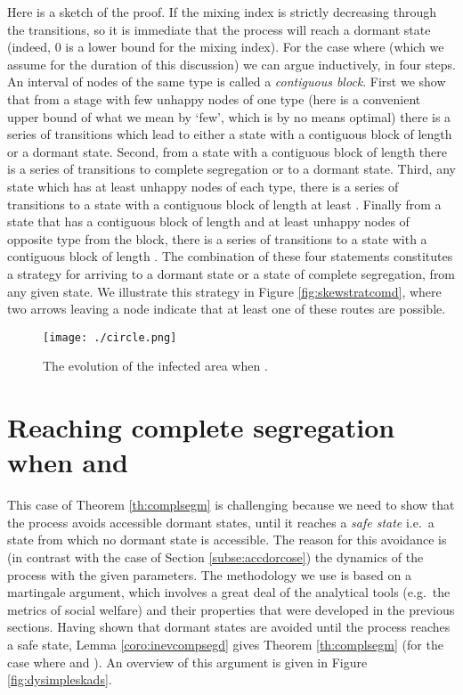 \documentclass[11pt]{article}
\theoremstyle{plain}
\numberwithin{equation}{subsection}
\begin{document}
Here is a sketch of the proof.
If  the mixing index is strictly decreasing through the transitions, so it is immediate
that the process will reach a dormant state (indeed, 0 is a lower bound for the mixing index).
For the case where  (which we assume for the duration of this discussion) we can argue
inductively, in four steps. 
An interval of nodes of the same type is called a {\em contiguous block}. 
First we show that
from a stage with few unhappy nodes of one type (here  is a convenient upper bound of
what we mean by `few', which is by no means optimal) there is a series of transitions which lead to either
a state with a contiguous block of length  or a dormant state.
Second, 
from a state with a contiguous block of length 
there is a series of transitions to complete segregation or to a dormant state.
Third,
any state which has at least  unhappy nodes of each type,
there is a series of transitions to a state with a contiguous 
block of length at least .
Finally 
from a state that has a contiguous block  of length 
and at least  unhappy nodes of opposite type from the block,  there is a series of
transitions to a state with a contiguous block  of length .
The combination of these four statements constitutes a strategy for arriving to a dormant state or
a state of complete segregation, from any given state.
We illustrate this strategy in Figure \ref{fig:skewstratcomd}, where
two arrows leaving a node indicate that at least one of these routes are possible.

 \begin{figure} 
\centering\texttt{[image: ./circle.png]}
\caption{The evolution of the infected area when .}\label{fig:cicle_slides}
\end{figure}  


\section{Reaching complete segregation \texorpdfstring{when  and  }{in the hard case}}\label{se:recomsehaca}
This case of Theorem \ref{th:complsegm} is challenging because we need to show that the process avoids accessible dormant states, until it reaches a {\em safe state}
i.e.\ a state from which no dormant state is accessible.
The reason for this avoidance is (in contrast with the case  of Section \ref{subse:accdorcose}) 
the dynamics of the process with the given parameters.
The methodology we use is based on a martingale argument, which involves a great deal of the analytical tools 
(e.g.\ the metrics of social welfare) and their properties that were developed in the previous sections.
Having shown that dormant states are avoided until the process reaches a safe state, Lemma \ref{coro:inevcompsegd} gives
Theorem \ref{th:complsegm} (for the case where  and  ). An overview of this argument is given in Figure \ref{fig:dysimpleskads}.
\end{document}
